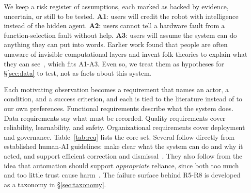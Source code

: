 \documentclass[sigconf]{acmart}
\begin{document}
We keep a risk register of assumptions, each marked as backed by evidence, uncertain, or still to be tested. \textbf{A1}: users will credit the robot with intelligence instead of the hidden agent. \textbf{A2}: users cannot tell a hardware fault from a function-selection fault without help. \textbf{A3}: users will assume the system can do anything they can put into words. Earlier work found that people are often unaware of invisible computational layers and invent folk theories to explain what they can see~\cite{eslami2015always, eslami2016first}, which fits A1-A3. Even so, we treat them as hypotheses for \S\ref{sec:data} to test, not as facts about this system.

Each motivating observation becomes a requirement that names an actor, a condition, and a success criterion, and each is tied to the literature instead of to our own preferences. Functional requirements describe what the system does. Data requirements say what must be recorded. Quality requirements cover reliability, learnability, and safety. Organizational requirements cover deployment and governance. Table~\ref{tab:req} lists the core set. Several follow directly from established human-AI guidelines: make clear what the system can do and why it acted, and support efficient correction and dismissal~\cite{amershi2019guidelines}. They also follow from the idea that automation should support \emph{appropriate} reliance, since both too much and too little trust cause harm~\cite{lee2004trust}. The failure surface behind R5-R8 is developed as a taxonomy in \S\ref{sec:taxonomy}.
\end{document}
